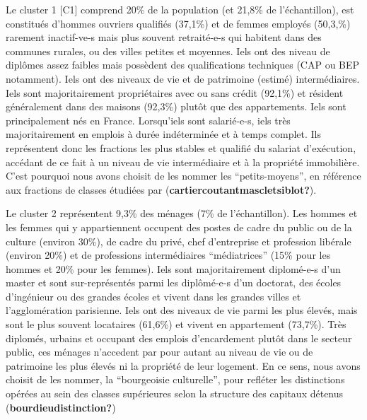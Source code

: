 \documentclass[
  12pt,
]{book}
\begin{document}
Le cluster 1 {[}C1{]} comprend 20\% de la population (et 21,8\% de
l'échantillon), est constitués d'hommes ouvriers qualifiés (37,1\%) et
de femmes employés (50,3,\%) rarement inactif-ve-s mais plus souvent
retraité-e-s qui habitent dans des communes rurales, ou des villes
petites et moyennes. Iels ont des niveau de diplômes assez faibles mais
possèdent des qualifications techniques (CAP ou BEP notamment). Iels ont
des niveaux de vie et de patrimoine (estimé) intermédiaires. Iels sont
majoritairement propriétaires avec ou sans crédit (92,1\%) et résident
généralement dans des maisons (92,3\%) plutôt que des appartements. Iels
sont principalement nés en France. Lorsqu'iels sont salarié-e-s, iels
très majoritairement en emplois à durée indéterminée et à temps complet.
Ils représentent donc les fractions les plus stables et qualifié du
salariat d'exécution, accédant de ce fait à un niveau de vie
intermédiaire et à la propriété immobilière. C'est pourquoi nous avons
choisit de les nommer les ``petits-moyens'', en référence aux fractions
de classes étudiées par (\textbf{cartiercoutantmascletsiblot?}).

Le cluster 2 représentent 9,3\% des ménages (7\% de l'échantillon). Les
hommes et les femmes qui y appartiennent occupent des postes de cadre du
public ou de la culture (environ 30\%), de cadre du privé, chef
d'entreprise et profession libérale (environ 20\%) et de professions
intermédiaires ``médiatrices'' (15\% pour les hommes et 20\% pour les
femmes). Iels sont majoritairement diplomé-e-s d'un master et sont
sur-représentés parmi les diplômé-e-s d'un doctorat, des écoles
d'ingénieur ou des grandes écoles et vivent dans les grandes villes et
l'agglomération parisienne. Iels ont des niveaux de vie parmi les plus
élevés, mais sont le plus souvent locataires (61,6\%) et vivent en
appartement (73,7\%). Très diplomés, urbains et occupant des emplois
d'encardement plutôt dans le secteur public, ces ménages n'accedent par
pour autant au niveau de vie ou de patrimoine les plus élevés ni la
propriété de leur logement. En ce sens, nous avons choisit de les
nommer, la ``bourgeoisie culturelle'', pour refléter les distinctions
opérées au sein des classes supérieures selon la structure des capitaux
détenus (\textbf{bourdieudistinction?})
\end{document}

